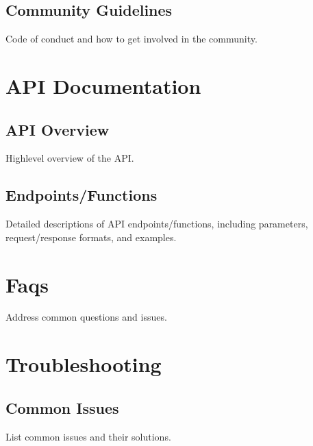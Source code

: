 \documentclass[letterpaper,10pt,english]{sphinxmanual}
\begin{document}
\section{Community Guidelines}
\label{\detokenize{contribution_guidelines:community-guidelines}}
\sphinxAtStartPar
Code of conduct and how to get involved in the community.

\sphinxstepscope


\chapter{API Documentation}
\label{\detokenize{api_documentation:api-documentation}}\label{\detokenize{api_documentation::doc}}

\section{API Overview}
\label{\detokenize{api_documentation:api-overview}}
\sphinxAtStartPar
High\sphinxhyphen{}level overview of the API.


\section{Endpoints/Functions}
\label{\detokenize{api_documentation:endpoints-functions}}
\sphinxAtStartPar
Detailed descriptions of API endpoints/functions, including parameters, request/response formats, and examples.

\sphinxstepscope


\chapter{Faqs}
\label{\detokenize{faqs:faqs}}\label{\detokenize{faqs::doc}}
\sphinxAtStartPar
Address common questions and issues.

\sphinxstepscope


\chapter{Troubleshooting}
\label{\detokenize{troubleshooting:troubleshooting}}\label{\detokenize{troubleshooting::doc}}

\section{Common Issues}
\label{\detokenize{troubleshooting:common-issues}}
\sphinxAtStartPar
List common issues and their solutions.
\end{document}
